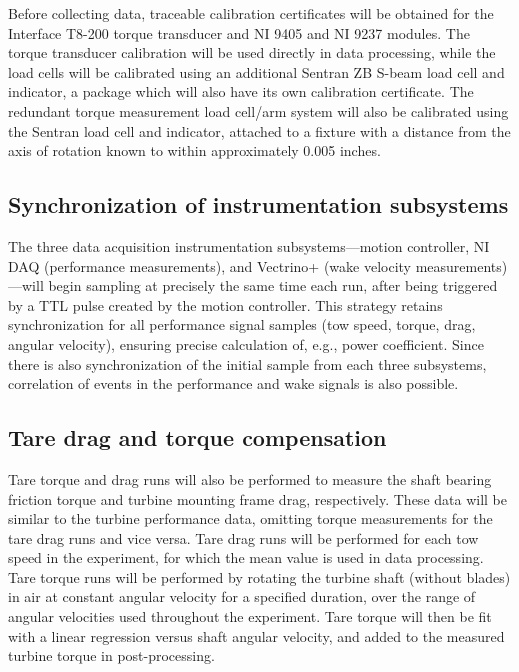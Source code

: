 \documentclass[12pt,letterpaper]{scrreprt}
\begin{document}
Before collecting data, traceable calibration certificates will be obtained for
the Interface T8-200 torque transducer and NI 9405 and NI 9237 modules. The
torque transducer calibration will be used directly in data processing, while
the load cells will be calibrated using an additional Sentran ZB S-beam load
cell and indicator, a package which will also have its own calibration
certificate. The redundant torque measurement load cell/arm system will also be
calibrated using the Sentran load cell and indicator, attached to a fixture with
a distance from the axis of rotation known to within approximately 0.005 inches.

\subsection{Synchronization of instrumentation subsystems}

The three data acquisition instrumentation subsystems---motion controller, NI
DAQ (performance measurements), and Vectrino+ (wake velocity
measurements)---will begin sampling at precisely the same time each run, after
being triggered by a TTL pulse created by the motion controller. This strategy
retains synchronization for all performance signal samples (tow speed, torque,
drag, angular velocity), ensuring precise calculation of, e.g., power
coefficient. Since there is also synchronization of the initial sample from each
three subsystems, correlation of events in the performance and wake signals is
also possible.

\subsection{Tare drag and torque compensation} 

Tare torque and drag runs will also be performed to measure the shaft bearing
friction torque and turbine mounting frame drag, respectively. These data will
be similar to the turbine performance data, omitting torque measurements for the
tare drag runs and vice versa. Tare drag runs will be performed for each tow
speed in the experiment, for which the mean value is used in data processing.
Tare torque runs will be performed by rotating the turbine shaft (without
blades) in air at constant angular velocity for a specified duration, over the
range of angular velocities used throughout the experiment. Tare torque will
then be fit with a linear regression versus shaft angular velocity, and added to
the measured turbine torque in post-processing.
\end{document}
